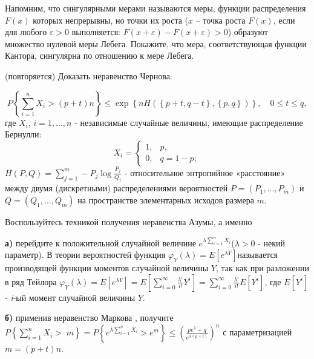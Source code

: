 \begin{problem}
Напомним, что сингулярными мерами называются меры, функции распределения $F(x)$ которых непрерывны, но точки их роста ($x$ -- точка роста $F(x)$, если для любого $\varepsilon >0$ выполняется: $F(x+\varepsilon )-F(x+\varepsilon )>0$) образуют множество нулевой меры Лебега. Покажите, что мера, соответствующая функции Кантора, сингулярна по отношению к мере Лебега.

\end{problem}


\begin{problem} (повторяется)
Доказать неравенство Чернова:

\[P\left\{\sum _{i=1}^{n}X_{i} >(p+t)n \right\}\le \exp \left\{nH\left(\left\{p+t,q-t\right\},\left\{p,q\right\}\right)\right\},\quad 0\le t\le q,\] 
где $X_{i} $, $i=1,...,n$ - независимые случайные величины, имеющие распределение Бернулли:
\[X_{i} =\left\{\begin{array}{cc} {1,} & {p,} \\ {0,} & {q=1-p;} \end{array}\right. \] 
$H\left(P,Q\right)=\sum _{j=1}^{m}-P_{j} \log \frac{P_{j} }{Q_{j} }  $ - относительное энтропийное «расстояние» между двумя (дискретными) распределениями вероятностей $P=\left(P_{1} ,\ldots ,P_{m} \right)$ и $Q=\left(Q_{1} ,\ldots ,Q_{m} \right)$ на пространстве элементарных исходов размера $m$.

\begin{ordre}
 
Воспользуйтесь техникой получения неравенства Азумы, а именно 

\noindent \textbf{а)} перейдите к положительной случайной величине $e^{\lambda \sum _{i=1}^{n}X_{i}  } $($\lambda >0$ - некий параметр). В теории вероятностей функция $\varphi _{Y} (\lambda )=E\left[e^{\lambda Y} \right]$называется производящей функции моментов случайной величины $Y$, так как при разложении в ряд Тейлора $\varphi _{Y} (\lambda )=E\left[e^{\lambda Y} \right]=E\left[\sum _{i=0}^{\infty }\frac{\lambda ^{i} }{i!} Y^{i}  \right]=\sum _{i=0}^{\infty }\frac{\lambda ^{i} }{i!} E\left[Y^{i} \right] $, где $E\left[Y^{i} \right]$ - \textit{i}-ый момент случайной величины $Y$.

\noindent \textbf{б)} применив неравенство Маркова , получите $P\left\{\sum _{i=1}^{n}X_{i} > \; m\right\}=P\left\{e^{\lambda \sum _{i=1}^{n}X_{i}  } >e^{m} \right\}\le \left(\frac{pe^{\lambda } +q}{e^{\lambda (p+t)} } \right)^{n} $ с параметризацией $m=(p+t)n$.


\end{ordre}
\end{problem}
